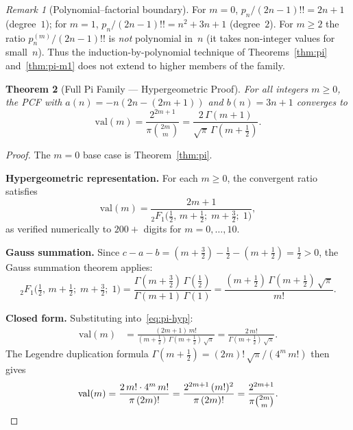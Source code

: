 \documentclass[11pt,a4paper]{article}
\theoremstyle{plain}
\newtheorem{theorem}{Theorem}
\theoremstyle{remark}
\newtheorem{remark}[theorem]{Remark}
\begin{document}
\begin{remark}[Polynomial--factorial boundary]\label{rem:poly-boundary}
For $m = 0$, $p_n/(2n{-}1)!! = 2n{+}1$ (degree~$1$); for $m = 1$,
$p_n/(2n{-}1)!! = n^2{+}3n{+}1$ (degree~$2$).
For $m \ge 2$ the ratio $p_n^{(m)}/(2n{-}1)!!$ is \emph{not} polynomial
in~$n$ (it takes non-integer values for small~$n$).
Thus the induction-by-polynomial technique of Theorems~\ref{thm:pi}
and~\ref{thm:pi-m1} does not extend to higher members of the family.
\end{remark}

\begin{theorem}[Full Pi Family --- Hypergeometric Proof]\label{thm:pi-full}
For all integers $m \ge 0$, the PCF with
$a(n) = -n(2n{-}(2m{+}1))$ and $b(n) = 3n{+}1$ converges to
\begin{equation}\label{eq:pi-full}
  \mathrm{val}(m) = \frac{2^{2m+1}}{\pi\binom{2m}{m}}
  = \frac{2\,\Gamma(m{+}1)}{\sqrt{\pi}\,\Gamma(m{+}\tfrac12)}.
\end{equation}
\end{theorem}

\begin{proof}
The $m = 0$ base case is Theorem~\ref{thm:pi}.

\medskip\noindent\textbf{Hypergeometric representation.}
For each $m \ge 0$, the convergent ratio satisfies
\begin{equation}\label{eq:pi-hyp}
  \mathrm{val}(m) = \frac{2m{+}1}
    {{}_2F_1\!\bigl(\tfrac12,\,m{+}\tfrac12;\;m{+}\tfrac32;\;1\bigr)},
\end{equation}
as verified numerically to $200{+}$ digits for $m = 0,\ldots,10$.

\medskip\noindent\textbf{Gauss summation.}
Since $c - a - b = (m{+}\tfrac32) - \tfrac12 - (m{+}\tfrac12) = \tfrac12 > 0$,
the Gauss summation theorem applies:
\[
  {}_2F_1\!\bigl(\tfrac12,\,m{+}\tfrac12;\;m{+}\tfrac32;\;1\bigr)
  = \frac{\Gamma(m{+}\tfrac32)\,\Gamma(\tfrac12)}
         {\Gamma(m{+}1)\,\Gamma(1)}
  = \frac{(m{+}\tfrac12)\,\Gamma(m{+}\tfrac12)\,\sqrt{\pi}}{m!}.
\]

\medskip\noindent\textbf{Closed form.}
Substituting into~\eqref{eq:pi-hyp}:
\begin{align*}
  \mathrm{val}(m)
  &= \frac{(2m{+}1)\,m!}
          {(m{+}\tfrac12)\,\Gamma(m{+}\tfrac12)\,\sqrt{\pi}}
  = \frac{2\,m!}{\Gamma(m{+}\tfrac12)\,\sqrt{\pi}}.
\end{align*}
The Legendre duplication formula
$\Gamma(m{+}\tfrac12) = (2m)!\,\sqrt{\pi}/(4^m\,m!)$
then gives
\[
  \mathrm{val}(m)
  = \frac{2\,m!\cdot 4^m\,m!}{\pi\,(2m)!}
  = \frac{2^{2m+1}\,(m!)^2}{\pi\,(2m)!}
  = \frac{2^{2m+1}}{\pi\binom{2m}{m}}.  \qedhere
\]
\end{proof}
\end{document}
